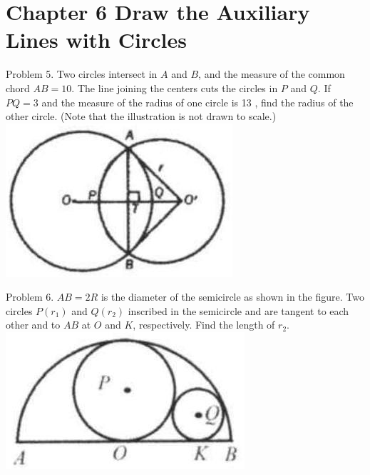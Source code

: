 \documentclass[10pt]{article}
\begin{document}
\section*{Chapter 6 Draw the Auxiliary Lines with Circles}
Problem 5. Two circles intersect in \(A\) and \(B\), and the measure of the common chord \(A B=10\). The line joining the centers cuts the circles in \(P\) and \(Q\). If \(P Q=3\) and the measure of the radius of one circle is 13 , find the radius of the other circle. (Note that the illustration is not drawn to scale.)\\
\includegraphics[max width=\textwidth, center]{2025_04_17_97bc1f7e44d93c271a88g-185}

Problem 6. \(A B=2 R\) is the diameter of the semicircle as shown in the figure. Two circles \(P\left(r_{1}\right)\) and \(Q\left(r_{2}\right)\) inscribed in the semicircle and are tangent to each other and to \(A B\) at \(O\) and \(K\), respectively. Find the length of \(r_{2}\).\\
\includegraphics[max width=\textwidth, center]{2025_04_17_97bc1f7e44d93c271a88g-185(2)}
\end{document}
